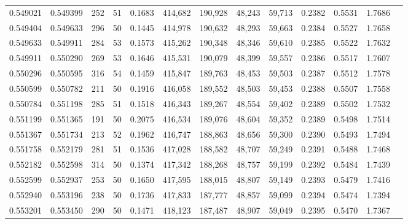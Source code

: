 \begin{tabular}{rrrrrrrrrrrrr}
0.549021 & 0.549399 &   252 &  51 &                                     0.1683 & 414,682 & 190,928 &  48,243 &  59,713 & 0.2382 & 0.5531 & 1.7686 \\
0.549404 & 0.549633 &   296 &  50 &                                     0.1445 & 414,978 & 190,632 &  48,293 &  59,663 & 0.2384 & 0.5527 & 1.7658 \\
0.549633 & 0.549911 &   284 &  53 &                                     0.1573 & 415,262 & 190,348 &  48,346 &  59,610 & 0.2385 & 0.5522 & 1.7632 \\
0.549911 & 0.550290 &   269 &  53 &                                     0.1646 & 415,531 & 190,079 &  48,399 &  59,557 & 0.2386 & 0.5517 & 1.7607 \\
0.550296 & 0.550595 &   316 &  54 &                                     0.1459 & 415,847 & 189,763 &  48,453 &  59,503 & 0.2387 & 0.5512 & 1.7578 \\
0.550599 & 0.550782 &   211 &  50 &                                     0.1916 & 416,058 & 189,552 &  48,503 &  59,453 & 0.2388 & 0.5507 & 1.7558 \\
0.550784 & 0.551198 &   285 &  51 &                                     0.1518 & 416,343 & 189,267 &  48,554 &  59,402 & 0.2389 & 0.5502 & 1.7532 \\
0.551199 & 0.551365 &   191 &  50 &                                     0.2075 & 416,534 & 189,076 &  48,604 &  59,352 & 0.2389 & 0.5498 & 1.7514 \\
0.551367 & 0.551734 &   213 &  52 &                                     0.1962 & 416,747 & 188,863 &  48,656 &  59,300 & 0.2390 & 0.5493 & 1.7494 \\
0.551758 & 0.552179 &   281 &  51 &                                     0.1536 & 417,028 & 188,582 &  48,707 &  59,249 & 0.2391 & 0.5488 & 1.7468 \\
0.552182 & 0.552598 &   314 &  50 &                                     0.1374 & 417,342 & 188,268 &  48,757 &  59,199 & 0.2392 & 0.5484 & 1.7439 \\
0.552599 & 0.552937 &   253 &  50 &                                     0.1650 & 417,595 & 188,015 &  48,807 &  59,149 & 0.2393 & 0.5479 & 1.7416 \\
0.552940 & 0.553196 &   238 &  50 &                                     0.1736 & 417,833 & 187,777 &  48,857 &  59,099 & 0.2394 & 0.5474 & 1.7394 \\
0.553201 & 0.553450 &   290 &  50 &                                     0.1471 & 418,123 & 187,487 &  48,907 &  59,049 & 0.2395 & 0.5470 & 1.7367 \\

\end{tabular}
